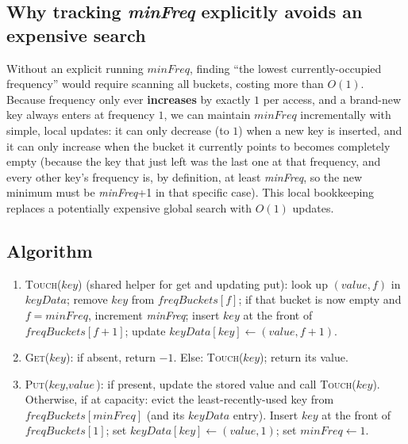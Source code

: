 \subsection*{Why tracking \textit{minFreq} explicitly avoids an expensive search}

Without an explicit running $\textit{minFreq}$, finding ``the lowest
currently-occupied frequency'' would require scanning all buckets,
costing more than $O(1)$. Because frequency only ever \textbf{increases}
by exactly $1$ per access, and a brand-new key always enters at frequency
$1$, we can maintain $\textit{minFreq}$ incrementally with simple,
local updates: it can only decrease (to $1$) when a new key is inserted,
and it can only increase when the bucket it currently points to becomes
completely empty (because the key that just left was the last one at that
frequency, and every other key's frequency is, by definition, at least
\textit{minFreq}, so the new minimum must be \textit{minFreq}+1 in that
specific case). This local bookkeeping replaces a potentially expensive
global search with $O(1)$ updates.

\subsection*{Algorithm}

\begin{enumerate}
  \item \textsc{Touch}($\textit{key}$) (shared helper for get and
        updating put): look up $(\textit{value}, f)$ in
        $\textit{keyData}$; remove $\textit{key}$ from
        $\textit{freqBuckets}[f]$; if that bucket is now empty and
        $f = \textit{minFreq}$, increment \textit{minFreq}; insert
        $\textit{key}$ at the front of $\textit{freqBuckets}[f+1]$;
        update $\textit{keyData}[\textit{key}] \gets (\textit{value},
        f+1)$.
  \item \textsc{Get}($\textit{key}$): if absent, return $-1$. Else:
        \textsc{Touch}($\textit{key}$); return its value.
  \item \textsc{Put}($\textit{key}, \textit{value}$): if present, update
        the stored value and call \textsc{Touch}($\textit{key}$).
        Otherwise, if at capacity: evict the least-recently-used key
        from $\textit{freqBuckets}[\textit{minFreq}]$ (and its
        $\textit{keyData}$ entry). Insert $\textit{key}$ at the front of
        $\textit{freqBuckets}[1]$; set $\textit{keyData}[\textit{key}]
        \gets (\textit{value}, 1)$; set $\textit{minFreq} \gets 1$.
\end{enumerate}

